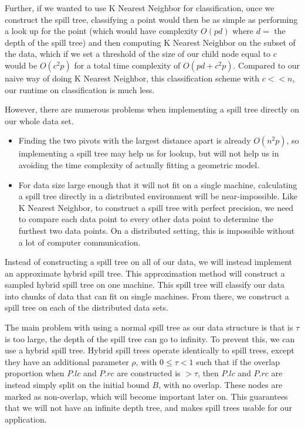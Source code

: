 \vspace{5 mm}
\noindent
Further, if we wanted to use K Nearest Neighbor for classification, once we 
construct the spill tree, classifying a point would then be as simple as 
performing a look up for the point (which would have complexity $O(p d)$ where 
$d = $ the depth of the spill tree) and then computing K Nearest Neighbor on 
the subset of the data, which if we set a threshold of the size of our child 
node equal to $c$ would be $O(c^{2} p)$ for a total time complexity of 
$O(p d + c^{2} p)$. Compared to our naive way of doing K Nearest Neighbor, 
this classification scheme with $c << n$, our runtime on classification is much 
less.

\vspace{5 mm}
\noindent
However, there are numerous problems when implementing a spill tree directly 
on our whole data set.

\begin{itemize}
\item Finding the two pivots with the largest distance apart is already 
$O(n^{2} p)$, so implementing a spill tree may help us for lookup, but will not 
help us in avoiding the time complexity of actually fitting a geometric model.
\item For data size large enough that it will not fit on a single machine, 
calculating a spill tree directly in a distributed environment will be 
near-impossible. Like K Nearest Neighbor, to construct a spill tree with 
perfect precision, we need to compare each data point to every other data 
point to determine the furthest two data points. On a distributed setting, this 
is impossible without a lot of computer communication.
\end{itemize}

\vspace{5 mm}
\noindent
Instead of constructing a spill tree on all of our data, we will instead 
implement an approximate hybrid spill tree. This approximation method will 
construct a sampled hybrid spill tree on one machine. This spill tree will 
classify our data into chunks of data that can fit on single machines. From 
there, we construct a spill tree on each of the distributed data sets.

\vspace{5 mm}
\noindent
The main problem with using a normal spill tree as our data structure is that is
$\tau$ is too large, the depth of the spill tree can go to infinity.  To prevent
this, we can use a hybrid spill tree.  Hybrid spill trees operate identically to
spill trees, except they have an additional parameter $\rho$, with $0 \le \tau <
1$  such that if the overlap proportion when $P.lc$ and $P.rc$ are constructed
is  $> \tau$, then $P.lc$ and $P.rc$ are instead simply split on the initial
bound  $B$, with no overlap.  These nodes are marked as non-overlap, which will
become  important later on.  This guarantees that we will not have an infinite
depth  tree, and makes spill trees usable for our application.

